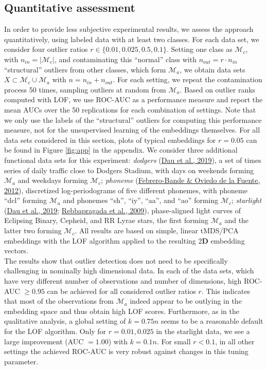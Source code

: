 \documentclass[
  10pt]{article}
\newcommand{\vizdim}{\mathbf{D}}        %
\newcommand{\co}{c}
\newcommand{\an}{a}
\newcommand{\Min}{\mathcal{M}_{\co}}
\newcommand{\Man}{\mathcal{M}_{\an}}
\begin{document}
\hypertarget{quantitative-assessment}{%
\subsection{\texorpdfstring{Quantitative assessment \label{sec:exps:quant}}{Quantitative assessment }}\label{quantitative-assessment}}

In order to provide less subjective experimental results, we assess the approach quantitatively, using labeled data with at least two classes. For each data set, we consider four outlier ratios \(r \in \{0.01, 0.025, 0.5, 0.1\}\). Setting one class as \(\Min\), with \(n_{in} = \vert \Min \vert\), and contaminating this ``normal'' class with \(n_{out} = r \cdot n_{in}\) ``structural'' outliers from other classes, which form \(\Man\), we obtain data sets \(X \subset \Min \cup \Man\) with \(n = n_{in} + n_{out}\). For each setting, we repeat the contamination process 50 times, sampling outliers at random from \(\Man\). Based on outlier ranks computed with LOF, we use ROC-AUC as a performance measure and report the mean AUCs over the 50 replications for each combination of settings. Note that we only use the labels of the ``structural'' outliers for computing this performance measure, not for the unsupervised learning of the embeddings themselves.
For all data sets considered in this section, plots of typical embeddings for \(r = 0.05\) can be found in Figure \ref{fig:app} in the appendix.
We consider three additional functional data sets for this experiment: \textit{dodgers} (\protect\hyperlink{ref-dau2019ucr}{Dau et al., 2019}), a set of times series of daily traffic close to Dodgers Stadium, with days on weekends forming \(\Man\) and weekdays forming \(\Min\); \textit{phoneme} (\protect\hyperlink{ref-febrero2012fdausc}{Febrero-Bande \& Oviedo de la Fuente, 2012}), discretized log-periodograms of five different phonemes, with phoneme ``dcl'' forming \(\Man\) and phonemes ``sh'', ``iy'', ``aa'', and ``ao'' forming \(\Min\); \textit{starlight} (\protect\hyperlink{ref-dau2019ucr}{Dau et al., 2019}; \protect\hyperlink{ref-rebbapragada2009finding}{Rebbapragada et al., 2009}), phase-aligned light curves of Eclipsing Binary, Cepheid, and RR Lyrae stars, the first forming \(\Man\) and the latter two forming \(\Min\). All results are based on simple, linear tMDS/PCA embeddings with the LOF algorithm applied to the resulting 2\(\vizdim\) embedding vectors.\\
The results show that outlier detection does not need to be specifically challenging in nominally high dimensional data. In each of the data sets, which have very different number of observations and number of dimensions, high ROC-AUC \(\geq 0.95\) can be achieved for all considered outlier ratios \(r\). This indicates that most of the observations from \(\Man\) indeed appear to be outlying in the embedding space and thus obtain high LOF scores. Furthermore, as in the qualitative analysis, a global setting of \(k = 0.75n\) seems to be a reasonable default for the LOF algorithm. Only for \(r = 0.01, 0.025\) in the starlight data,
we see a large improvement (AUC \(= 1.00\)) with \(k = 0.1n\). For small \(r < 0.1\), in all other settings the achieved ROC-AUC is very robust against changes in this tuning parameter.
\end{document}
